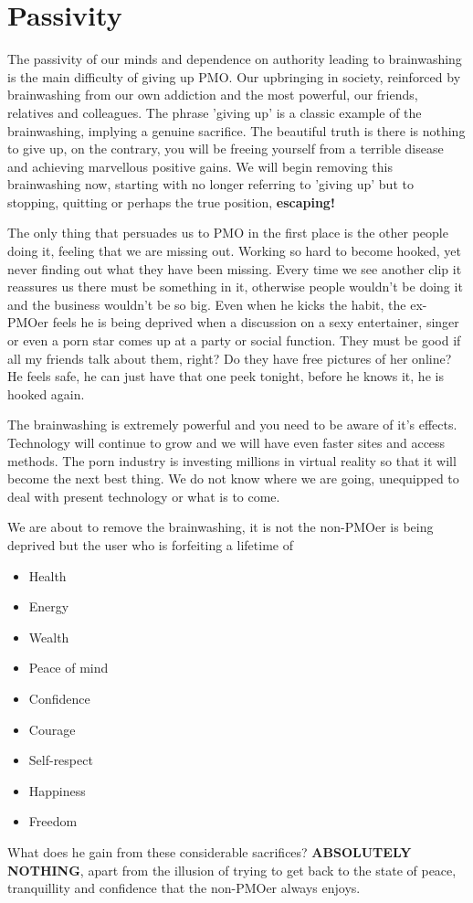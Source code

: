 \documentclass[easypeasy.tex]{subfiles}
\begin{document}
\section{Passivity}
The passivity of our minds and dependence on authority leading to brainwashing is the main difficulty of giving up PMO. Our upbringing in society, reinforced by brainwashing from our own addiction and the most powerful, our friends, relatives and colleagues. The phrase 'giving up' is a classic example of the brainwashing, implying a genuine sacrifice. The beautiful truth is there is nothing to give up, on the contrary, you will be freeing yourself from a terrible disease and achieving marvellous positive gains. We will begin removing this brainwashing now, starting with no longer referring to 'giving up' but to stopping, quitting or perhaps the true position, \textbf{escaping!}

The only thing that persuades us to PMO in the first place is the other people doing it, feeling that we are missing out. Working so hard to become hooked, yet never finding out what they have been missing. Every time we see another clip it reassures us there must be something in it, otherwise people wouldn't be doing it and the business wouldn't be so big. Even when he kicks the habit, the ex-PMOer feels he is being deprived when a discussion on a sexy entertainer, singer or even a porn star comes up at a party or social function. They must be good if all my friends talk about them, right? Do they have free pictures of her online? He feels safe, he can just have that one peek tonight, before he knows it, he is hooked again.

The brainwashing is extremely powerful and you need to be aware of it's effects. Technology will continue to grow and we will have even faster sites and access methods. The porn industry is investing millions in virtual reality so that it will become the next best thing. We do not know where we are going, unequipped to deal with present technology or what is to come.

We are about to remove the brainwashing, it is not the non-PMOer is being deprived but the user who is forfeiting a lifetime of
\begin{itemize}
  \item Health
  \item Energy
  \item Wealth
  \item Peace of mind
  \item Confidence
  \item Courage
  \item Self-respect
  \item Happiness
  \item Freedom
\end{itemize}
What does he gain from these considerable sacrifices? \textbf{ABSOLUTELY NOTHING}, apart from the illusion of trying to get back to the state of peace, tranquillity and confidence that the non-PMOer always enjoys.
\end{document}
